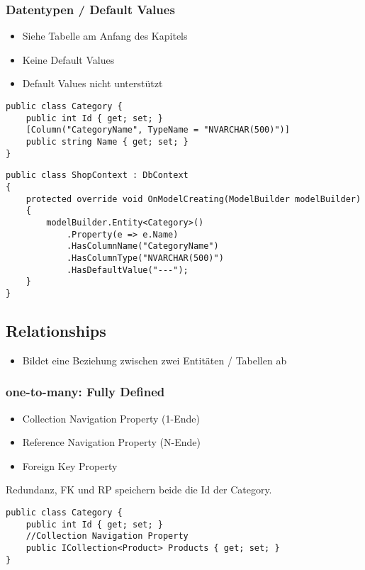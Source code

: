 \begin{multicols*}{2}
\subsubsection{Datentypen / Default Values}
\begin{itemize}
    \item Siehe Tabelle am Anfang des Kapitels
    \item Keine Default Values
\end{itemize}
\begin{itemize}
    \item Default Values nicht unterstützt
\end{itemize}
\begin{lstlisting}
public class Category {
    public int Id { get; set; }
    [Column("CategoryName", TypeName = "NVARCHAR(500)")] 
    public string Name { get; set; }
}
\end{lstlisting}
\begin{lstlisting}
public class ShopContext : DbContext 
{
    protected override void OnModelCreating(ModelBuilder modelBuilder)
    {
        modelBuilder.Entity<Category>()
            .Property(e => e.Name)
            .HasColumnName("CategoryName")
            .HasColumnType("NVARCHAR(500)")
            .HasDefaultValue("---");
    } 
}
\end{lstlisting}

\subsection{Relationships}
\begin{itemize}
    \item Bildet eine Beziehung zwischen zwei Entitäten / Tabellen ab
\end{itemize}
\subsubsection{one-to-many: Fully Defined}
\begin{itemize}
    \item Collection Navigation Property (1-Ende)
    \item Reference Navigation Property (N-Ende)
    \item Foreign Key Property
\end{itemize}
Redundanz, FK und RP speichern beide die Id der Category.
\begin{lstlisting}
public class Category {
    public int Id { get; set; }
    //Collection Navigation Property
    public ICollection<Product> Products { get; set; } 
}


\end{lstlisting}
\end{multicols*}
